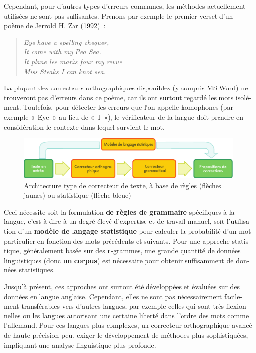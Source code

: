 \begin{french}
\begin{multicols}{2}
Cependant, pour d'autres types d'erreurs communes, les
méthodes actuellement utilisées ne sont pas suffisantes. Prenons par
exemple le premier verset d'un poème de Jerrold H. Zar
(1992)~:

\begin{quote}
{\em Eye have a spelling chequer,\\
It came with my Pea Sea.\\
It plane lee marks four my revue\\
Miss Steaks I can knot sea.}\\
\end{quote}
La plupart des correcteurs orthographiques disponibles (y compris MS
Word) ne trouveront pas d'erreurs dans ce poème, car ils ont surtout
regardé les mots isolément. Toutefois, pour détecter les erreurs que
l'on appelle homophones (par exemple «~Eye~» au lieu de «~I~»), le
vérificateur de la langue doit prendre en considération le contexte
dans lequel survient le mot.

\begin{figure}[t]
\begin{center}
  \includegraphics[width=\textwidth]{../_media/french/language_checking.pdf}
\caption{Architecture type de correcteur de texte, à base de règles
  (flèches jaunes) ou statistique (flèche bleue)}
\label{fig:spellchecker}
\end{center}
\end{figure}

Ceci nécessite soit la formulation {\bf de règles
de grammaire} spécifiques à la langue, c'est-à-dire à un degré élevé d'expertise et de travail
manuel, soit l'utilisation d'un {\bf modèle de langage statistique} pour
calculer la probabilité d'un mot particulier en fonction des mots
précédents et suivants. Pour une approche statistique, généralement
basée sur des n-grammes, une grande quantité de données linguistiques
(donc {\bf un corpus}) est nécessaire pour obtenir suffisamment de données
statistiques.

Jusqu'à présent, ces approches ont surtout été développées et évaluées
sur des données en langue anglaise. Cependant, elles ne sont pas
nécessairement facilement transférables vers d'autres langues, par
exemple celles qui sont très flexionnelles ou les langues autorisant
une certaine liberté dans l'ordre des mots comme l'allemand. Pour ces langues
plus complexes, un correcteur orthographique avancé de haute précision
peut exiger le développement de méthodes plus sophistiquées,
impliquant une analyse linguistique plus profonde.


\end{multicols}
\end{french}

